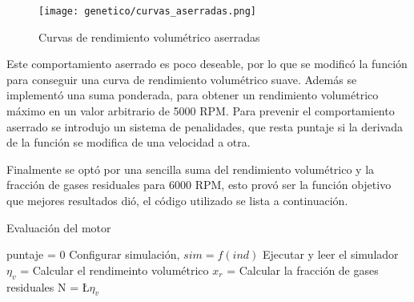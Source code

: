 \begin{figure}[ht]
  \centering
  \texttt{[image: genetico/curvas\_aserradas.png]}
  \caption{Curvas de rendimiento volumétrico aserradas}\label{fig:curva_aserrada}
\end{figure}


Este comportamiento aserrado es poco deseable, por lo que se modificó la
función para conseguir una curva de rendimiento volumétrico suave.
%
Además se implementó una suma ponderada, para obtener un rendimiento
volumétrico máximo en un valor arbitrario de 5000 RPM.\@
%
Para prevenir el comportamiento aserrado se introdujo un sistema de penalidades,
que resta puntaje si la derivada de la función se modifica de una velocidad a
otra.

Finalmente se optó por una sencilla suma del rendimiento volumétrico y la
fracción de gases residuales para 6000 RPM, esto provó ser la función objetivo
que mejores resultados dió, el código utilizado se lista a continuación.



\begin{algorithm} \caption{Evaluación del motor}\label{algo:pre_puntaje}
  \BlankLine

  puntaje = 0\;
  Configurar simulación, $sim=f(ind)$\;
  Ejecutar y leer el simulador\;
  $\eta_{v}$ = Calcular el rendimeinto volumétrico\;
  $x_{r}$ = Calcular la fracción de gases residuales\;
  N = \L{$\eta_{v}$}
  \;
\end{algorithm}


